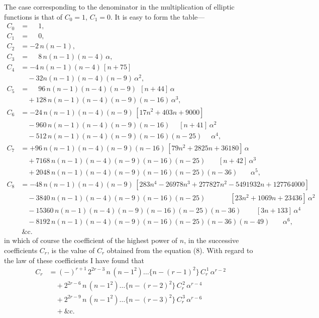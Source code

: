 \documentclass[11pt,a4paper]{book}
\begin{document}
The case corresponding to the denominator in the multiplication of elliptic functions is that of $C_0 = 1$, $C_1 = 0$. It is easy to form the table---
\begin{align*}
C_0 &= \phantom{-}1, \\
C_1 &= \phantom{-}0, \\
C_2 &= -2\,n(n-1), \\
C_3 &= \phantom{-}8\,n(n-1)(n-4)\,\alpha, \\
C_4 &= -4\,n(n-1)(n-4)\,[n+75] \\
  &\quad - 32n(n-1)(n-4)(n-9)\,\alpha^2, \\
C_5 &= \phantom{-}96\,n(n-1)(n-4)(n-9)\,\;[n+44]\,\alpha \\
  &\quad + 128\,n(n-1)(n-4)(n-9)(n-16)\,\alpha^3, \\
C_6 &= -24\,n(n-1)(n-4)(n-9)\,[17n^2 + 403n + 9000] \\
  &\quad - 960\,n(n-1)(n-4)(n-9)(n-16)\,\;\;\;\;[n+41]\,\alpha^2 \\
  &\quad - 512\,n(n-1)(n-4)(n-9)(n-16)(n-25)\,\;\;\;\;\alpha^4, \\
C_7 &= +96\,n(n-1)(n-4)(n-9)(n-16)\,[79n^2 + 2825n + 36180]\,\alpha \\
  &\quad + 7168\,n(n-1)(n-4)(n-9)(n-16)(n-25)\,\;\;\;\;\;\;[n+42]\,\alpha^3 \\
  &\quad + 2048\,n(n-1)(n-4)(n-9)(n-16)(n-25)(n-36)\,\;\;\;\;\;\;\alpha^5,\\[6pt]
C_8 &= -48\,n(n-1)(n-4)(n-9)\,[283n^4 - 26978n^3 + 277827n^2 - 5491932n + 127764000] \\
  &\quad - 3840\,n(n-1)(n-4)(n-9)(n-16)(n-25)\,\;\;\;\;\;\;\;\;\;\;\;\;[23n^2 + 1069n + 23436]\,\alpha^2 \\
  &\quad - 15360\,n(n-1)(n-4)(n-9)(n-16)(n-25)(n-36)\,\;\;\;\;\;\;\;[3n + 133]\,\alpha^4 \\
  &\quad - 8192\,n(n-1)(n-4)(n-9)(n-16)(n-25)(n-36)(n-49)\,\;\;\;\;\;\;\alpha^6, \\
  &\ \&\text{c.}
\end{align*}
in which of course the coefficient of the highest power of $n$, in the successive coefficients $C_r$, is the value of $C_r$ obtained from the equation (8). With regard to the law of these coefficients I have found that
\begin{align*}
C_r &= (-)^{r+1}\, 2^{2r-3}\, n\,(n-1^2) \ldots \{n-(r-1)^2\}\, C_r^{\,1}\, \alpha^{r-2} \\
  &\quad + 2^{2r-6}\, n\,(n-1^2) \ldots \{n-(r-2)^2\}\, C_r^{\,2}\, \alpha^{r-4} \\
  &\quad + 2^{2r-9}\, n\,(n-1^2) \ldots \{n-(r-3)^2\}\, C_r^{\,3}\, \alpha^{r-6} \\
  &\quad + \&\text{c.}
\end{align*}
\end{document}
